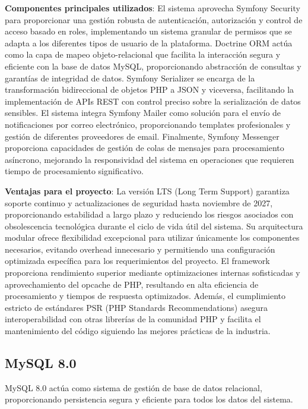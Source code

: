 \documentclass[12pt,a4paper,oneside]{report}
\begin{document}
\textbf{Componentes principales utilizados}: El sistema aprovecha Symfony Security para proporcionar una gestión robusta de autenticación, autorización y control de acceso basado en roles, implementando un sistema granular de permisos que se adapta a los diferentes tipos de usuario de la plataforma. Doctrine ORM actúa como la capa de mapeo objeto-relacional que facilita la interacción segura y eficiente con la base de datos MySQL, proporcionando abstracción de consultas y garantías de integridad de datos. Symfony Serializer se encarga de la transformación bidireccional de objetos PHP a JSON y viceversa, facilitando la implementación de APIs REST con control preciso sobre la serialización de datos sensibles. El sistema integra Symfony Mailer como solución para el envío de notificaciones por correo electrónico, proporcionando templates profesionales y gestión de diferentes proveedores de email. Finalmente, Symfony Messenger proporciona capacidades de gestión de colas de mensajes para procesamiento asíncrono, mejorando la responsividad del sistema en operaciones que requieren tiempo de procesamiento significativo.

\textbf{Ventajas para el proyecto}: La versión LTS (Long Term Support) garantiza soporte continuo y actualizaciones de seguridad hasta noviembre de 2027, proporcionando estabilidad a largo plazo y reduciendo los riesgos asociados con obsolescencia tecnológica durante el ciclo de vida útil del sistema. Su arquitectura modular ofrece flexibilidad excepcional para utilizar únicamente los componentes necesarios, evitando overhead innecesario y permitiendo una configuración optimizada específica para los requerimientos del proyecto. El framework proporciona rendimiento superior mediante optimizaciones internas sofisticadas y aprovechamiento del opcache de PHP, resultando en alta eficiencia de procesamiento y tiempos de respuesta optimizados. Además, el cumplimiento estricto de estándares PSR (PHP Standards Recommendations) asegura interoperabilidad con otras librerías de la comunidad PHP y facilita el mantenimiento del código siguiendo las mejores prácticas de la industria.

\subsection{MySQL 8.0}\label{mysql-8.0}

MySQL 8.0 actúa como sistema de gestión de base de datos relacional,
proporcionando persistencia segura y eficiente para todos los datos del
sistema.
\end{document}
